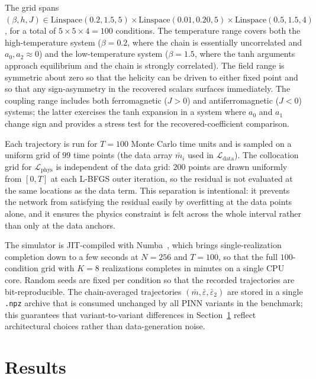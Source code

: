 \documentclass[conference]{IEEEtran}
\newcommand{\eps}{\varepsilon}
\newcommand{\epstwo}{\varepsilon_2}
\begin{document}
The grid spans
$(\beta, h, J) \in \mathrm{Linspace}(0.2, 1.5, 5)
\times \mathrm{Linspace}(0.01, 0.20, 5)
\times \mathrm{Linspace}(0.5, 1.5, 4)$,
for a total of $5 \times 5 \times 4 = 100$ conditions. The temperature
range covers both the high-temperature system ($\beta = 0.2$, where
the chain is essentially uncorrelated and $a_0, a_2 \!\approx\! 0$)
and the low-temperature system ($\beta = 1.5$, where the tanh
arguments approach equilibrium and the chain is strongly correlated).
The field range is symmetric about zero so that the helicity can
be driven to either fixed point and so that any sign-asymmetry in the
recovered scalars surfaces immediately. The coupling range includes
both ferromagnetic ($J > 0$) and antiferromagnetic ($J < 0$)
systems; the latter exercises the tanh expansion in a system where
$a_0$ and $a_1$ change sign and provides a stress test for the
recovered-coefficient comparison.


Each trajectory is run for $T = 100$ Monte Carlo time units and is
sampled on a uniform grid of $99$ time points (the data array
$\bar m_i$ used in $\mathcal{L}_\text{data}$). The collocation grid
for $\mathcal{L}_\text{phys}$ is independent of the data grid: $200$
points are drawn uniformly from $[0, T]$ at each L-BFGS outer
iteration, so the residual is not evaluated at the same locations as
the data term. This separation is intentional: it prevents the network
from satisfying the residual easily by overfitting at the data
points alone, and it ensures the physics constraint is felt across the
whole interval rather than only at the data anchors.


The simulator is JIT-compiled with Numba~\cite{numba}, which brings
single-realization completion down to a few seconds at $N = 256$ and
$T = 100$, so that the full $100$-condition grid with $K = 8$
realizations completes in minutes on a single CPU core. Random seeds
are fixed per condition so that the recorded trajectories are
bit-reproducible. The chain-averaged trajectories
$(\bar m, \bar\eps, \bar\epstwo)$ are stored in a single
\texttt{.npz} archive that is consumed unchanged by all PINN variants
in the benchmark; this guarantees that variant-to-variant differences
in Section~\ref{sec:results} reflect architectural choices rather than
data-generation noise.

\section{Results}
\label{sec:results}
\end{document}
